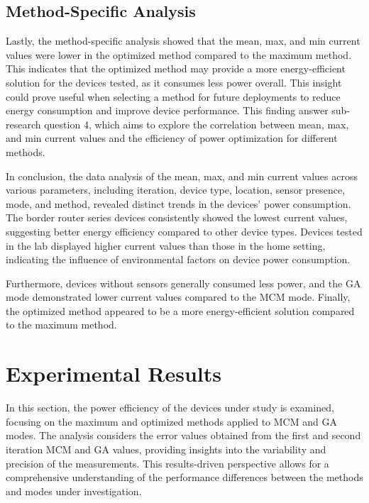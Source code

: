 \subsection{Method-Specific Analysis}

Lastly, the method-specific analysis showed that the mean, max, and min current values were lower in the optimized method compared to the maximum method. This indicates that the optimized method may provide a more energy-efficient solution for the devices tested, as it consumes less power overall. This insight could prove useful when selecting a method for future deployments to reduce energy consumption and improve device performance. This finding answer sub-research question 4, which aims to explore the correlation between mean, max, and min current values and the efficiency of power optimization for different methods.

\vspace{3mm}
In conclusion, the data analysis of the mean, max, and min current values across various parameters, including iteration, device type, location, sensor presence, mode, and method, revealed distinct trends in the devices' power consumption. The border router series devices consistently showed the lowest current values, suggesting better energy efficiency compared to other device types. Devices tested in the lab displayed higher current values than those in the home setting, indicating the influence of environmental factors on device power consumption.

Furthermore, devices without sensors generally consumed less power, and the \gls{GA} mode demonstrated lower current values compared to the \gls{MCM} mode. Finally, the optimized method appeared to be a more energy-efficient solution compared to the maximum method.


\section{Experimental Results}

In this section, the power efficiency of the devices under study is examined, focusing on the maximum and optimized methods applied to \gls{MCM} and \gls{GA} modes. The analysis considers the error values obtained from the first and second iteration \gls{MCM} and \gls{GA} values, providing insights into the variability and precision of the measurements. This results-driven perspective allows for a comprehensive understanding of the performance differences between the methods and modes under investigation.

